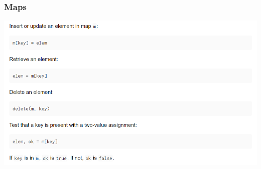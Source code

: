 \documentclass[14pt]{beamer}
\begin{document}
{
\begin{frame}
    \frametitle{Maps}
    \includegraphics[width=\linewidth]{img/mutatingmaps.PNG}
\end{frame}
}
\end{document}
